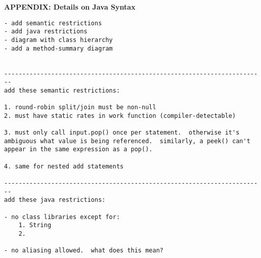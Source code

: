 \clearpage

\renewcommand{\theequation}{A-\arabic{equation}}
\setcounter{equation}{0}  %

\begin{center}
{\bf APPENDIX:  Details on Java Syntax}
\end{center}

\begin{verbatim}
- add semantic restrictions
- add java restrictions
- diagram with class hierarchy
- add a method-summary diagram


------------------------------------------------------------------------
add these semantic restrictions:

1. round-robin split/join must be non-null
2. must have static rates in work function (compiler-detectable)

3. must only call input.pop() once per statement.  otherwise it's
ambiguous what value is being referenced.  similarly, a peek() can't
appear in the same expression as a pop().

4. same for nested add statements

------------------------------------------------------------------------
add these java restrictions:

- no class libraries except for:
	1. String
	2. 

- no aliasing allowed.  what does this mean?

\end{verbatim}
